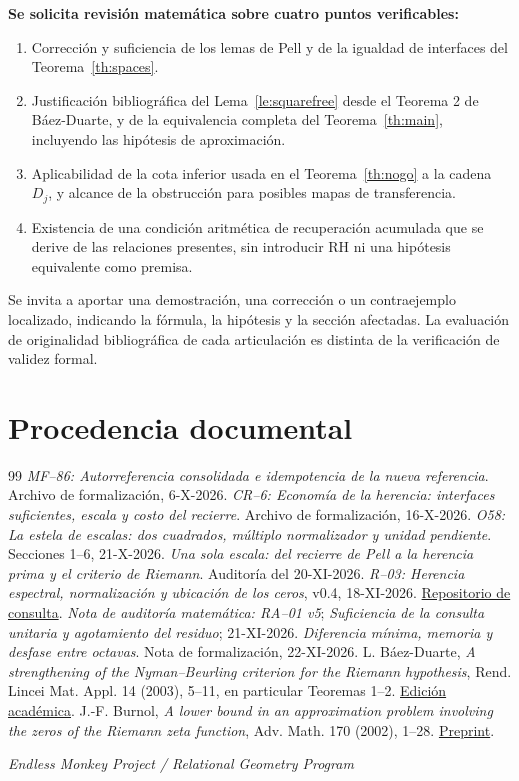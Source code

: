 \documentclass[11pt,a4paper]{article}
\theoremstyle{mine}
\theoremstyle{definition}
\begin{document}
\textbf{Se solicita revisión matemática sobre cuatro puntos verificables:}
\begin{enumerate}
\item Corrección y suficiencia de los lemas de Pell y de la igualdad de interfaces del Teorema~\ref{th:spaces}.
\item Justificación bibliográfica del Lema~\ref{le:squarefree} desde el Teorema 2 de Báez-Duarte, y de la equivalencia completa del Teorema~\ref{th:main}, incluyendo las hipótesis de aproximación.
\item Aplicabilidad de la cota inferior usada en el Teorema~\ref{th:nogo} a la cadena $D_j$, y alcance de la obstrucción para posibles mapas de transferencia.
\item Existencia de una condición aritmética de recuperación acumulada que se derive de las relaciones presentes, sin introducir RH ni una hipótesis equivalente como premisa.
\end{enumerate}

Se invita a aportar una demostración, una corrección o un contraejemplo localizado, indicando la fórmula, la hipótesis y la sección afectadas. La evaluación de originalidad bibliográfica de cada articulación es distinta de la verificación de validez formal.

\section*{Procedencia documental}
\begin{thebibliography}{99}\setlength{\itemsep}{3pt}
 \textit{MF--86: Autorreferencia consolidada e idempotencia de la nueva referencia}. Archivo de formalización, 6-X-2026.
 \textit{CR--6: Economía de la herencia: interfaces suficientes, escala y costo del recierre}. Archivo de formalización, 16-X-2026.
 \textit{O58: La estela de escalas: dos cuadrados, múltiplo normalizador y unidad pendiente}. Secciones 1--6, 21-X-2026.
 \textit{Una sola escala: del recierre de Pell a la herencia prima y el criterio de Riemann}. Auditoría del 20-XI-2026.
 \textit{R--03: Herencia espectral, normalización y ubicación de los ceros}, v0.4, 18-XI-2026. \href{https://github.com/EndlessMonkeyProyect/programa-geometria-relacional}{Repositorio de consulta}.
 \textit{Nota de auditoría matemática: RA--01 v5}; \textit{Suficiencia de la consulta unitaria y agotamiento del residuo}; 21-XI-2026.
 \textit{Diferencia mínima, memoria y desfase entre octavas}. Nota de formalización, 22-XI-2026.
 L. Báez-Duarte, \textit{A strengthening of the Nyman--Beurling criterion for the Riemann hypothesis}, Rend. Lincei Mat. Appl. 14 (2003), 5--11, en particular Teoremas 1--2. \href{https://www.bdim.eu/item?id=RLIN_2003_9_14_1_5_0}{Edición académica}.
 J.-F. Burnol, \textit{A lower bound in an approximation problem involving the zeros of the Riemann zeta function}, Adv. Math. 170 (2002), 1--28. \href{https://arxiv.org/abs/math/0103058}{Preprint}.
\end{thebibliography}
\medskip\noindent\textit{Endless Monkey Project / Relational Geometry Program}
\end{document}
